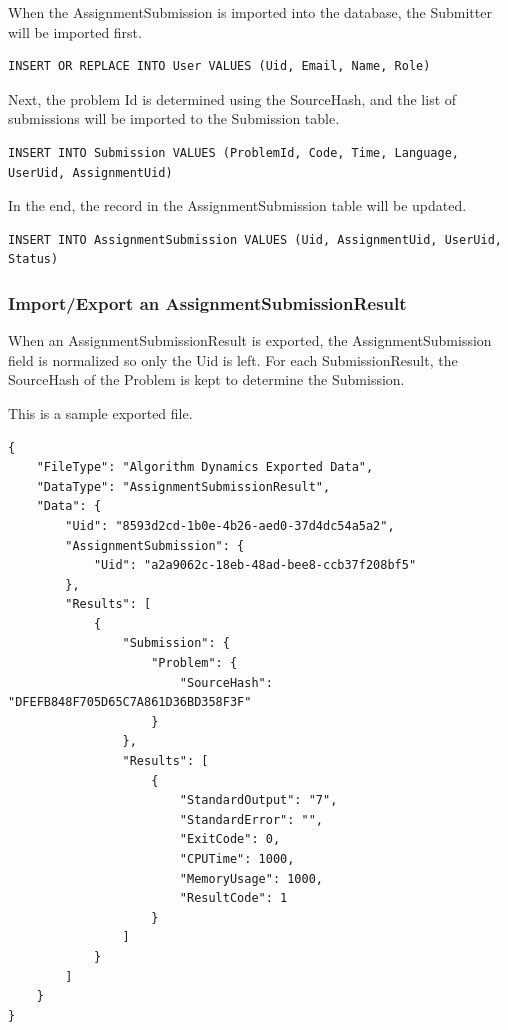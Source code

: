\documentclass[a4paper]{report}
\begin{document}
When the AssignmentSubmission is imported into the database, the Submitter will be imported first.

\begin{verbatim}
INSERT OR REPLACE INTO User VALUES (Uid, Email, Name, Role)
\end{verbatim}

Next, the problem Id is determined using the SourceHash, and the list of submissions will be imported to the Submission table.

\begin{verbatim}
INSERT INTO Submission VALUES (ProblemId, Code, Time, Language, UserUid, AssignmentUid)
\end{verbatim}

In the end, the record in the AssignmentSubmission table will be updated.

\begin{verbatim}
INSERT INTO AssignmentSubmission VALUES (Uid, AssignmentUid, UserUid, Status)
\end{verbatim}

\subsubsection{Import/Export an AssignmentSubmissionResult}

When an AssignmentSubmissionResult is exported, the AssignmentSubmission field is normalized so only the Uid is left. For each SubmissionResult, the SourceHash of the Problem is kept to determine the Submission.

This is a sample exported file.

\begin{verbatim}
{
    "FileType": "Algorithm Dynamics Exported Data",
    "DataType": "AssignmentSubmissionResult",
    "Data": {
        "Uid": "8593d2cd-1b0e-4b26-aed0-37d4dc54a5a2",
        "AssignmentSubmission": {
            "Uid": "a2a9062c-18eb-48ad-bee8-ccb37f208bf5"
        },
        "Results": [
            {
                "Submission": {
                    "Problem": {
                        "SourceHash": "DFEFB848F705D65C7A861D36BD358F3F"
                    }
                },
                "Results": [
                    {
                        "StandardOutput": "7",
                        "StandardError": "",
                        "ExitCode": 0,
                        "CPUTime": 1000,
                        "MemoryUsage": 1000,
                        "ResultCode": 1
                    }
                ]
            }
        ]
    }
}
\end{verbatim}
\end{document}
